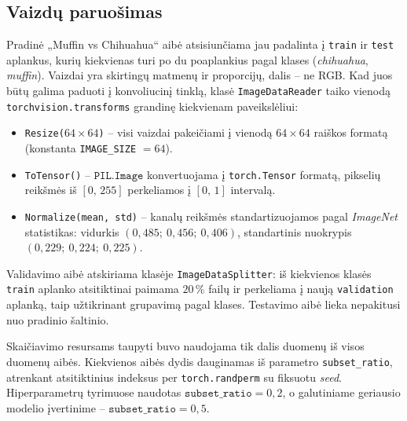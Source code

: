 \subsection{Vaizdų paruošimas}
\label{subsec:vaizdu_paruosimas}

Pradinė „Muffin vs Chihuahua“ aibė atsisiunčiama jau padalinta į \texttt{train} ir \texttt{test} aplankus, kurių kiekvienas turi po du poaplankius pagal klases (\textit{chihuahua}, \textit{muffin}). Vaizdai yra skirtingų matmenų ir proporcijų, dalis – ne RGB. Kad juos būtų galima paduoti į konvoliucinį tinklą, klasė \texttt{ImageDataReader} taiko vienodą \texttt{torchvision.transforms} grandinę kiekvienam paveikslėliui:
\begin{itemize}
    \item \texttt{Resize($64 \times 64$)} – visi vaizdai pakeičiami į vienodą $64 \times 64$ raiškos formatą (konstanta \texttt{IMAGE\_SIZE} $= 64$).
    \item \texttt{ToTensor()} – $\texttt{PIL.Image}$ konvertuojama į \texttt{torch.Tensor} formatą, pikselių reikšmės iš $[0,\,255]$ perkeliamos į $[0,\,1]$ intervalą.
    \item \texttt{Normalize(mean, std)} – kanalų reikšmės standartizuojamos pagal \textit{ImageNet} statistikas: vidurkis $(0{,}485;\ 0{,}456;\ 0{,}406)$, standartinis nuokrypis $(0{,}229;\ 0{,}224;\ 0{,}225)$.
\end{itemize}

Validavimo aibė atskiriama klasėje \texttt{ImageDataSplitter}: iš kiekvienos klasės \texttt{train} aplanko atsitiktinai paimama $20\,\%$ failų ir perkeliama į naują \texttt{validation} aplanką, taip užtikrinant grupavimą pagal klases. Testavimo aibė lieka nepakitusi nuo pradinio šaltinio.

Skaičiavimo resursams taupyti buvo naudojama tik dalis duomenų iš visos duomenų aibės. Kiekvienos aibės dydis dauginamas iš parametro \texttt{subset\_ratio}, atrenkant atsitiktinius indeksus per \texttt{torch.randperm} su fiksuotu \textit{seed}. Hiperparametrų tyrimuose naudotas $\texttt{subset\_ratio} = 0{,}2$, o galutiniame geriausio modelio įvertinime – $\texttt{subset\_ratio} = 0{,}5$.
